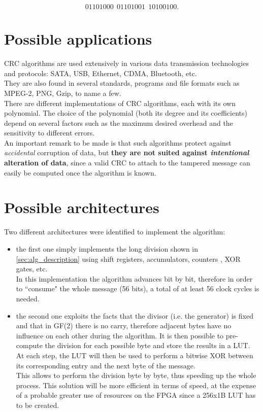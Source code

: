	\begin{equation}
	01101000\:\:01101001\:\:10100100 .
	\label{eq:example_with_FCS}	
	\end{equation}


\section{Possible applications}\label{sec:possible_applications}
CRC algorithms are used extensively in various data transmission technologies and protocols: SATA, USB, Ethernet, CDMA, Bluetooth, etc.\\
They are also found in several standards, programs and file formats such as MPEG-2, PNG, Gzip, to name a few.\\
There are different implementations of CRC algorithms, each with its own polynomial. The choice of the polynomial (both its degree and its coefficients) depend on several factors such as the maximum desired overhead and the sensitivity to different errors.\\

\noindent An important remark to be made is that such algorithms protect against \textit{accidental} corruption of data, but \textbf{they are not suited against \textit{intentional} alteration of data}, since a valid CRC to attach to the tampered message can easily be computed once the algorithm is known.

\section{Possible architectures}\label{sec:possible_architectures}
Two different architectures were identified to implement the algorithm:
\begin{itemize}
\item the first one simply implements the long division shown in \ref{sec:alg_description} using shift registers, accumulators, counters , XOR gates, etc.\\
In this implementation the algorithm advances bit by bit, therefore in order to ``consume" the whole message (56 bits), a total of at least 56 clock cycles is needed.
\item the second one exploits the facts that the divisor (i.e. the generator) is fixed and that in GF(2) there is no carry, therefore adjacent bytes have no influence on each other during the algorithm. It is then possible to pre-compute the division for each possible byte and store the results in a LUT.\\
At each step, the LUT will then be used to perform a bitwise XOR between its corresponding entry and the next byte of the message.\\
This allows to perform the division byte by byte, thus speeding up the whole process. This solution will be more efficient in terms of speed, at the expense of a probable greater use of resources on the FPGA since a 256x1B LUT has to be created.
\end{itemize}
